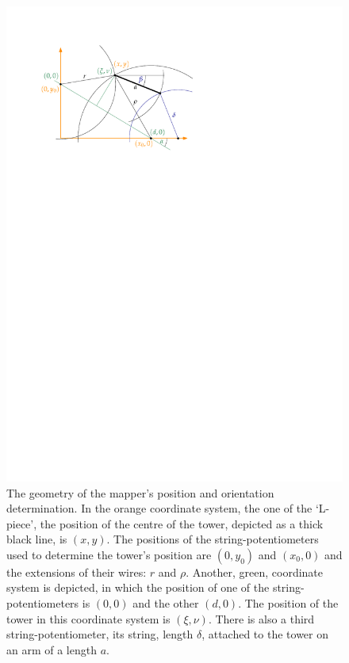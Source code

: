 \begin{figure}
  \centering
  \includegraphics[width=0.7\linewidth]{gfx/mapping/geometry.pdf}
  \caption{The geometry of the mapper's position and orientation determination. In the orange coordinate system, the one of the `L-piece', the position of the centre of the tower, depicted as a thick black line, is $(x,y)$. The positions of the string-potentiometers used to determine the tower's position are $(0, y_0)$ and $(x_0, 0)$ and the extensions of their wires: $r$ and $\rho$. Another, green, coordinate system is depicted, in which the position of one of the string-potentiometers is $(0,0)$ and the other $(d, 0)$. The position of the tower in this coordinate system is $(\xi, \nu)$. There is also a third string-potentiometer, its string, length $\delta$, attached to the tower on an arm of a length $a$.}\label{fig:mapping_geometry}
\end{figure}

